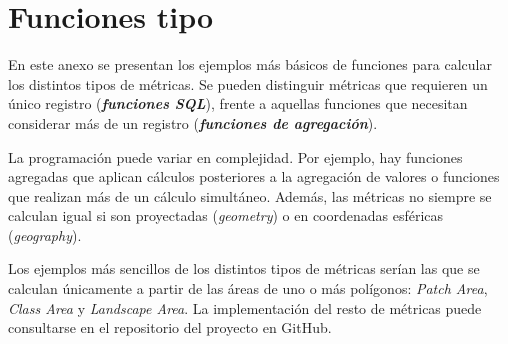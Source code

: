 \chapter{Funciones tipo}\label{anex:funcionestipo}

En este anexo se presentan los ejemplos más básicos de funciones para calcular los distintos tipos de métricas. Se pueden distinguir métricas que requieren un único registro (\textbf{\textit{funciones SQL}}), frente a aquellas funciones que necesitan considerar más de un registro (\textbf{\textit{funciones de agregación}}).

La programación puede variar en complejidad. Por ejemplo, hay funciones agregadas que aplican cálculos posteriores a la agregación de valores o funciones que realizan más de un cálculo simultáneo. Además, las métricas no siempre se calculan igual si son proyectadas (\textit{geometry}) o en coordenadas esféricas (\textit{geography}).

Los ejemplos más sencillos de los distintos tipos de métricas serían las que se calculan únicamente a partir de las áreas de uno o más polígonos: \textit{Patch Area}, \textit{Class Area} y \textit{Landscape Area}. La implementación del resto de métricas puede consultarse en el repositorio del proyecto en GitHub.

\pagebreak


\pagebreak

\pagebreak
